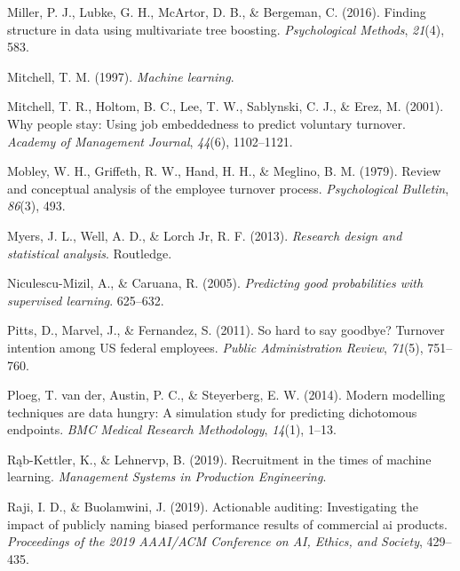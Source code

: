 \documentclass[
  man]{apa7}
\newlength{\cslhangindent}
\newlength{\cslentryspacingunit} %
\newenvironment{CSLReferences}[2] %
 {%
  \setlength{\parindent}{0pt}
  \ifodd #1
  \let\oldpar\par
  \def\par{\hangindent=\cslhangindent\oldpar}
  \fi
  \setlength{\parskip}{#2\cslentryspacingunit}
 }%
 {}
\begin{document}
\begin{CSLReferences}{1}{0}
\leavevmode{}%
Miller, P. J., Lubke, G. H., McArtor, D. B., \& Bergeman, C. (2016). Finding structure in data using multivariate tree boosting. \emph{Psychological Methods}, \emph{21}(4), 583.

\leavevmode{}%
Mitchell, T. M. (1997). \emph{Machine learning}.

\leavevmode{}%
Mitchell, T. R., Holtom, B. C., Lee, T. W., Sablynski, C. J., \& Erez, M. (2001). Why people stay: Using job embeddedness to predict voluntary turnover. \emph{Academy of Management Journal}, \emph{44}(6), 1102--1121.

\leavevmode{}%
Mobley, W. H., Griffeth, R. W., Hand, H. H., \& Meglino, B. M. (1979). Review and conceptual analysis of the employee turnover process. \emph{Psychological Bulletin}, \emph{86}(3), 493.

\leavevmode{}%
Myers, J. L., Well, A. D., \& Lorch Jr, R. F. (2013). \emph{Research design and statistical analysis}. Routledge.

\leavevmode{}%
Niculescu-Mizil, A., \& Caruana, R. (2005). \emph{Predicting good probabilities with supervised learning}. 625--632.

\leavevmode{}%
Pitts, D., Marvel, J., \& Fernandez, S. (2011). So hard to say goodbye? Turnover intention among US federal employees. \emph{Public Administration Review}, \emph{71}(5), 751--760.

\leavevmode{}%
Ploeg, T. van der, Austin, P. C., \& Steyerberg, E. W. (2014). Modern modelling techniques are data hungry: A simulation study for predicting dichotomous endpoints. \emph{BMC Medical Research Methodology}, \emph{14}(1), 1--13.

\leavevmode{}%
Rąb-Kettler, K., \& Lehnervp, B. (2019). Recruitment in the times of machine learning. \emph{Management Systems in Production Engineering}.

\leavevmode{}%
Raji, I. D., \& Buolamwini, J. (2019). Actionable auditing: Investigating the impact of publicly naming biased performance results of commercial ai products. \emph{Proceedings of the 2019 AAAI/ACM Conference on AI, Ethics, and Society}, 429--435.


\end{CSLReferences}
\end{document}
